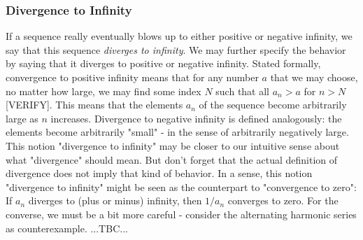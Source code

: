 \subsubsection{Divergence to Infinity}
If a sequence really eventually blows up to either positive or negative infinity, we say that this sequence \emph{diverges to infinity}. We may further specify the behavior by saying that it diverges to positive or negative infinity. Stated formally, convergence to positive infinity means that for any number $a$ that we may choose, no matter how large, we may find some index $N$ such that all $a_n > a$ for $n > N$ [VERIFY]. This means that the elements $a_n$ of the sequence become arbitrarily large as $n$ increases. Divergence to negative infinity is defined analogously: the elements become arbitrarily "small" - in the sense of arbitrarily negatively large. This notion "divergence to infinity" may be closer to our intuitive sense about what "divergence" should mean. But don't forget that the actual definition of divergence does not imply that kind of behavior. In a sense, this notion "divergence to infinity" might be seen as the counterpart to "convergence to zero": If $a_n$ diverges to (plus or minus) infinity, then $1/a_n$ converges to zero. For the converse, we must be a bit more careful - consider the alternating harmonic series as counterexample. ...TBC...










